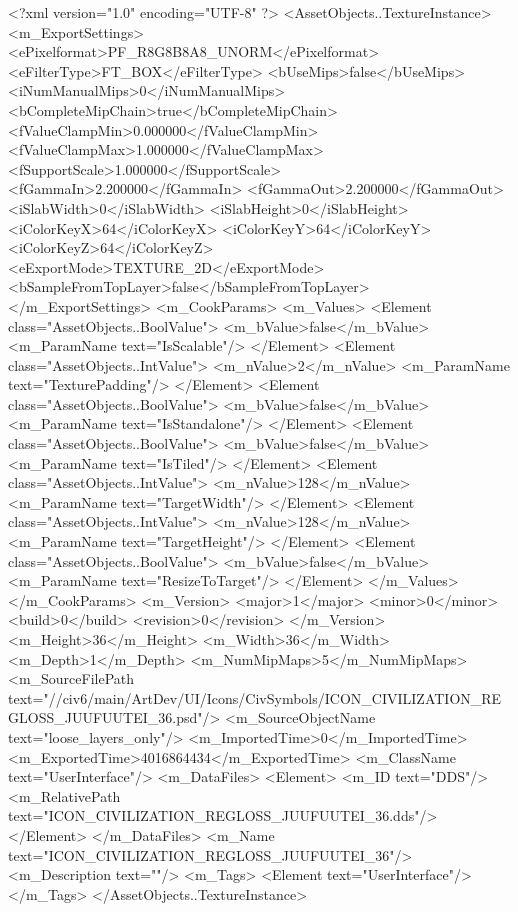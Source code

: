 <?xml version="1.0" encoding="UTF-8" ?>
<AssetObjects..TextureInstance>
	<m_ExportSettings>
		<ePixelformat>PF_R8G8B8A8_UNORM</ePixelformat>
		<eFilterType>FT_BOX</eFilterType>
		<bUseMips>false</bUseMips>
		<iNumManualMips>0</iNumManualMips>
		<bCompleteMipChain>true</bCompleteMipChain>
		<fValueClampMin>0.000000</fValueClampMin>
		<fValueClampMax>1.000000</fValueClampMax>
		<fSupportScale>1.000000</fSupportScale>
		<fGammaIn>2.200000</fGammaIn>
		<fGammaOut>2.200000</fGammaOut>
		<iSlabWidth>0</iSlabWidth>
		<iSlabHeight>0</iSlabHeight>
		<iColorKeyX>64</iColorKeyX>
		<iColorKeyY>64</iColorKeyY>
		<iColorKeyZ>64</iColorKeyZ>
		<eExportMode>TEXTURE_2D</eExportMode>
		<bSampleFromTopLayer>false</bSampleFromTopLayer>
	</m_ExportSettings>
	<m_CookParams>
		<m_Values>
			<Element class="AssetObjects..BoolValue">
				<m_bValue>false</m_bValue>
				<m_ParamName text="IsScalable"/>
			</Element>
			<Element class="AssetObjects..IntValue">
				<m_nValue>2</m_nValue>
				<m_ParamName text="TexturePadding"/>
			</Element>
			<Element class="AssetObjects..BoolValue">
				<m_bValue>false</m_bValue>
				<m_ParamName text="IsStandalone"/>
			</Element>
			<Element class="AssetObjects..BoolValue">
				<m_bValue>false</m_bValue>
				<m_ParamName text="IsTiled"/>
			</Element>
			<Element class="AssetObjects..IntValue">
				<m_nValue>128</m_nValue>
				<m_ParamName text="TargetWidth"/>
			</Element>
			<Element class="AssetObjects..IntValue">
				<m_nValue>128</m_nValue>
				<m_ParamName text="TargetHeight"/>
			</Element>
			<Element class="AssetObjects..BoolValue">
				<m_bValue>false</m_bValue>
				<m_ParamName text="ResizeToTarget"/>
			</Element>
		</m_Values>
	</m_CookParams>
	<m_Version>
		<major>1</major>
		<minor>0</minor>
		<build>0</build>
		<revision>0</revision>
	</m_Version>
	<m_Height>36</m_Height>
	<m_Width>36</m_Width>
	<m_Depth>1</m_Depth>
	<m_NumMipMaps>5</m_NumMipMaps>
	<m_SourceFilePath text="//civ6/main/ArtDev/UI/Icons/CivSymbols/ICON_CIVILIZATION_REGLOSS_JUUFUUTEI_36.psd"/>
	<m_SourceObjectName text="loose_layers_only"/>
	<m_ImportedTime>0</m_ImportedTime>
	<m_ExportedTime>4016864434</m_ExportedTime>
	<m_ClassName text="UserInterface"/>
	<m_DataFiles>
		<Element>
			<m_ID text="DDS"/>
			<m_RelativePath text="ICON_CIVILIZATION_REGLOSS_JUUFUUTEI_36.dds"/>
		</Element>
	</m_DataFiles>
	<m_Name text="ICON_CIVILIZATION_REGLOSS_JUUFUUTEI_36"/>
	<m_Description text=""/>
	<m_Tags>
		<Element text="UserInterface"/>
	</m_Tags>
</AssetObjects..TextureInstance>

